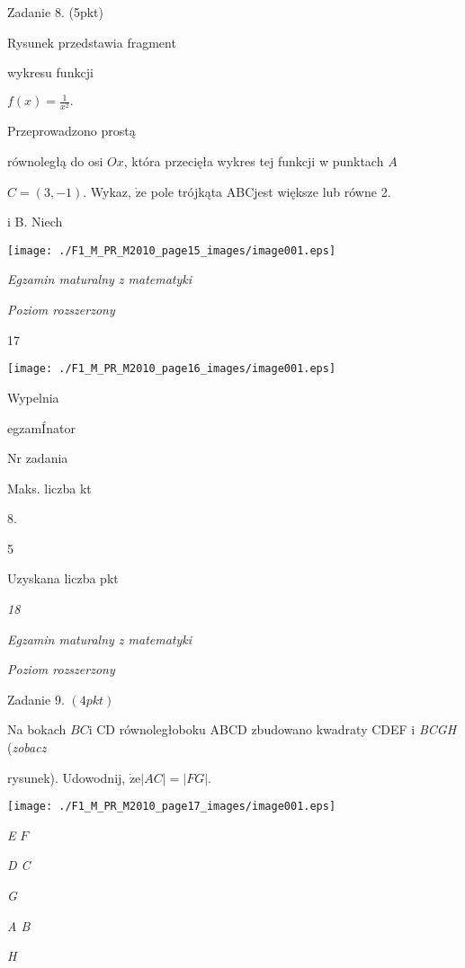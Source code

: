 \documentclass[a4paper,12pt]{article}
\begin{document}
Zadanie 8. (5pkt)

Rysunek przedstawia fragment

wykresu funkcji

$f(x)=\displaystyle \frac{1}{x^{2}}.$

Przeprowadzono prostą

równoległą do osi $Ox$, która przecięła wykres tej funkcji w punktach $A$

$C=(3,-1)$. Wykaz, $\dot{\mathrm{z}}\mathrm{e}$ pole trójkąta ABCjest większe lub równe 2.

i B. Niech
\begin{center}
\texttt{[image: ./F1\_M\_PR\_M2010\_page15\_images/image001.eps]}
\end{center}




{\it Egzamin maturalny z matematyki}

{\it Poziom rozszerzony}

17
\begin{center}
\texttt{[image: ./F1\_M\_PR\_M2010\_page16\_images/image001.eps]}
\end{center}
Wypelnia

egzamÍnator

Nr zadania

Maks. liczba kt

8.

5

Uzyskana liczba pkt





{\it 18}

{\it Egzamin maturalny z matematyki}

{\it Poziom rozszerzony}

Zadanie 9. $(4pkt)$

Na bokach $BC\mathrm{i}$ CD równoległoboku ABCD zbudowano kwadraty CDEF $\mathrm{i}$ {\it BCGH} ({\it zobacz}

rysunek). Udowodnij, $\dot{\mathrm{z}}\mathrm{e}|AC|=|FG|.$
\begin{center}
\texttt{[image: ./F1\_M\_PR\_M2010\_page17\_images/image001.eps]}
\end{center}
{\it E} $F$

{\it D  C}

{\it G}

{\it A  B}

{\it H}
\end{document}
